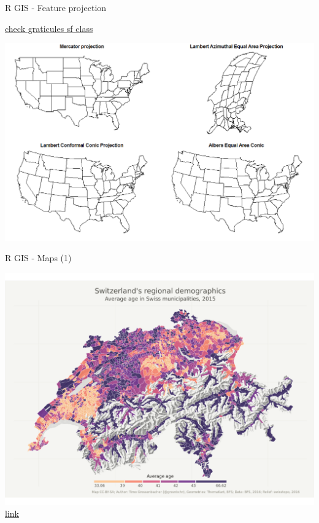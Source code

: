 \documentclass[9pt,ignorenonframetext,]{beamer}
\begin{document}
\begin{frame}{R GIS - Feature projection}

\href{http://r-spatial.org/r/2017/01/12/newssf.html}{check graticules sf
class}

\includegraphics{imgPres/R_GIS_projection.png}

\end{frame}

\begin{frame}{R GIS - Maps (1)}

\includegraphics{imgPres/demo/R_as_a_GIS.png}
\href{https://timogrossenbacher.ch/2016/12/beautiful-thematic-maps-with-ggplot2-only/}{link}

\end{frame}
\end{document}
